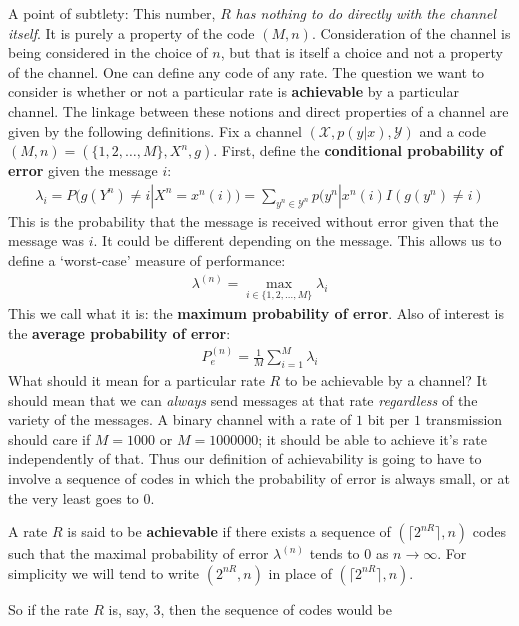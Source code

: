 A point of subtlety: This number, $R$ \emph{has nothing to do directly with the channel itself}. It is purely a property of the code $(M,n)$. Consideration of the channel is being considered in the choice of $n$, but that is itself a choice and not a property of the channel. One can define any code of any rate. The question we want to consider is whether or not a particular rate is \textbf{achievable} by a particular channel. The linkage between these notions and direct properties of a channel are given by the following definitions. Fix a channel $(\mathcal{X},p(y|x),\mathcal{Y})$ and a code $(M,n) = (\{1,2,\ldots,M\},X^n,g)$. First, define the \textbf{conditional probability of error} given the message $i$:
	\begin{align}
		\lambda_i = P(g(Y^n) \neq i | X^n=x^n(i)) = \sum_{y^n \in \mathcal{Y}^n} p(y^n|x^n(i)I(g(y^n)\neq i)
	\end{align}
This is the probability that the message is received without error given that the message was $i$. It could be different depending on the message. This allows us to define a `worst-case' measure of performance: 
	\begin{align}
		\lambda^{(n)} = \max_{i \in \{1,2,\ldots,M\}} \lambda_i
	\end{align}
This we call what it is: the \textbf{maximum probability of error}. Also of interest is the \textbf{average probability of error}:
	\begin{align}
		P_e^{(n)} = \frac{1}{M}\sum_{i=1}^M \lambda_i
	\end{align}
What should it mean for a particular rate $R$ to be achievable by a channel? It should mean that we can \emph{always} send messages at that rate \emph{regardless} of the variety of the messages. A binary channel with a rate of $1$ bit per $1$ transmission should care if $M = 1000$ or $M=1000000$; it should be able to achieve it's rate independently of that. Thus our definition of achievability is going to have to involve a sequence of codes in which the probability of error is always small, or at the very least goes to $0$.
\begin{definition}
 A rate $R$ is said to be \textbf{achievable} if there exists a sequence of $(\lceil 2^{nR} \rceil,n)$ codes such that the maximal probability of error $\lambda^{(n)}$ tends to $0$ as $n \to \infty$. For simplicity we will tend to write $(2^{nR},n)$ in place of $(\lceil 2^{nR} \rceil,n)$. 
\end{definition}
So if the rate $R$ is, say, $3$, then the sequence of codes would be 

